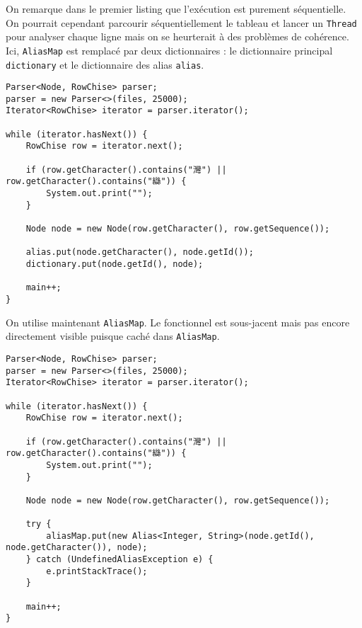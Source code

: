 \documentclass[12pt,onecolumn]{article}
\begin{document}
On remarque dans le premier listing que l'exécution est purement séquentielle. On pourrait cependant parcourir séquentiellement le tableau et lancer un \texttt{Thread} pour analyser chaque ligne mais on se heurterait à des problèmes de cohérence. Ici, \texttt{AliasMap} est remplacé par deux dictionnaires : le dictionnaire principal \texttt{dictionary} et le dictionnaire des alias \texttt{alias}.
\begin{lstlisting}[caption={Impératif pur. Premier jet sans \texttt{AliasMap}}]
Parser<Node, RowChise> parser;
parser = new Parser<>(files, 25000);
Iterator<RowChise> iterator = parser.iterator();

while (iterator.hasNext()) {
	RowChise row = iterator.next();

	if (row.getCharacter().contains("灣") || row.getCharacter().contains("䜌")) {
		System.out.print("");
	}

	Node node = new Node(row.getCharacter(), row.getSequence());

	alias.put(node.getCharacter(), node.getId());
	dictionary.put(node.getId(), node);

	main++;
}
\end{lstlisting}

On utilise maintenant \texttt{AliasMap}. Le fonctionnel est sous-jacent mais pas encore directement visible puisque caché dans \texttt{AliasMap}.
\begin{lstlisting}[caption={Impératif pur. Avec \texttt{AliasMap}}]
Parser<Node, RowChise> parser;
parser = new Parser<>(files, 25000);
Iterator<RowChise> iterator = parser.iterator();

while (iterator.hasNext()) {
	RowChise row = iterator.next();

	if (row.getCharacter().contains("灣") || row.getCharacter().contains("䜌")) {
		System.out.print("");
	}

	Node node = new Node(row.getCharacter(), row.getSequence());

	try {
		aliasMap.put(new Alias<Integer, String>(node.getId(), node.getCharacter()), node);
	} catch (UndefinedAliasException e) {
		e.printStackTrace();
	}

	main++;
}
\end{lstlisting}
\end{document}
